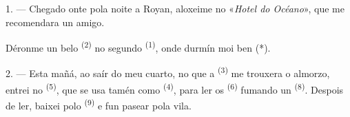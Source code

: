 %
%
%


\VUsaut{3.0mm}
\VUsaut{1.6mm}
\VUsaut{2.0mm}
\VUsaut{3.4mm}

1. --- Chegado onte pola noite a Royan, aloxeime no «\textit{Hotel do Océano}», que me
recomendara un amigo.

Déronme un belo  \textsuperscript{(2)} no segundo 
\textsuperscript{(1)}, onde durmín moi ben (*).

2. --- Esta mañá, ao saír do meu cuarto, no que a 
\textsuperscript{(3)} me trouxera o almorzo, entrei no 
\textsuperscript{(5)}, que se usa tamén como 
\textsuperscript{(4)}, para ler os  \textsuperscript{(6)} fumando un
 \textsuperscript{(8)}. Despois de ler, baixei polo
 \textsuperscript{(9)} e fun pasear pola vila.


